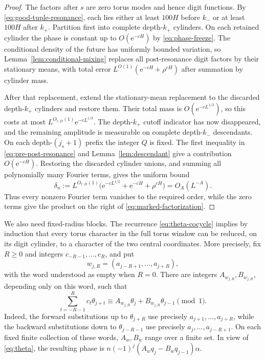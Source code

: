 \documentclass[11pt,a4paper]{amsart}
\theoremstyle{definition}
\theoremstyle{remark}
\newcommand{\e}{\mathrm e}
\begin{document}
\begin{proof}
The factors after $s$ are zero torus modes and hence digit functions.  By
\eqref{eq:good-tuple-resonance}, each lies either at least $100H$ before
$k_-$ or at least $100H$ after $k_+$.  Partition first into complete
depth-$k_+$ cylinders.  On each retained cylinder the phase is constant up to
$O(\e^{-cH})$ by \eqref{eq:phase-freeze}.  The conditional density of the
future has uniformly bounded variation, so
Lemma~\ref{lem:conditional-mixing}
replaces all post-resonance digit factors by their stationary means, with
total error $L^{O(1)}(\e^{-cH}+\rho^{cH})$ after summation by cylinder mass.

After that replacement, extend the stationary-mean replacement to the
discarded depth-$k_+$ cylinders and restore them.  Their total mass is
$O(\e^{-cL^{1/2}})$, so this costs at most
$L^{O_{r,D}(1)}\e^{-cL^{1/2}}$.  The depth-$k_+$ cutoff indicator has now
disappeared, and the remaining amplitude is measurable on complete
depth-$k_-$ descendants.  On each depth-$(j_s+1)$ prefix the integer $Q$ is
fixed.  The first inequality in \eqref{eq:pre-post-resonance} and
Lemma~\ref{lem:descendant} give a contribution $O(\e^{-cH})$.  Restoring the
discarded cylinder unions, and summing all polynomially many Fourier terms,
gives the uniform bound
\begin{equation}\label{eq:delta-n}
 \delta_n:=L^{O_{r,D}(1)}
 \bigl(\e^{-cL^{1/2}}+\e^{-cH}+\rho^{cH}\bigr)=O_A(L^{-A}).
\end{equation}
Thus every nonzero Fourier term vanishes to the required order, while the
zero terms give the product on the right of
\eqref{eq:marked-factorization}.
\end{proof}

We also need fixed-radius blocks.  The recurrence
\eqref{eq:theta-cocycle} implies by induction that every torus character in
the full torus window can be reduced, on its digit cylinder, to a character
of the two central coordinates.  More precisely, fix $R\ge0$ and integers
$c_{-R-1},\ldots,c_R$, and put
\[
 w_{j,R}=(a_{j-R+1},\ldots,a_{j+R}),
\]
with the word understood as empty when $R=0$.  There are integers
$A_{w_{j,R}},B_{w_{j,R}}$, depending only on this word, such that
\begin{equation}\label{eq:block-character-reduction}
 \sum_{t=-R-1}^{R}c_t\theta_{j+t}
 \equiv A_{w_{j,R}}\theta_j+B_{w_{j,R}}\theta_{j-1}\pmod1.
\end{equation}
Indeed, the forward substitutions up to $\theta_{j+R}$ use precisely
$a_{j+1},\ldots,a_{j+R}$, while the backward substitutions down to
$\theta_{j-R-1}$ use precisely $a_j,\ldots,a_{j-R+1}$.  On each fixed finite
collection of these words, $A_w,B_w$ range over a finite set.  In view of
\eqref{eq:theta}, the resulting phase is
$n(-1)^j(A_wq_j-B_wq_{j-1})\alpha$.
\end{document}

